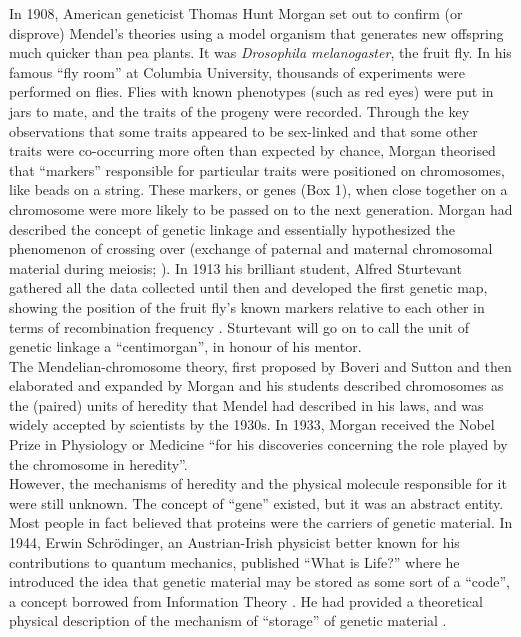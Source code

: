 In 1908, American geneticist Thomas Hunt Morgan set out to confirm (or disprove) Mendel’s theories using a model organism that generates new offspring much quicker than pea plants. 
It was \textit{Drosophila melanogaster}, the fruit fly. 
In his famous “fly room” at Columbia University, thousands of experiments were performed on flies. 
Flies with known phenotypes (such as red eyes) were put in jars to mate, and the traits of the progeny were recorded. 
Through the key observations that some traits appeared to be sex-linked and that some other traits were co-occurring more often than expected by chance, Morgan theorised that “markers” responsible for particular traits were positioned on chromosomes, like beads on a string. 
These markers, or genes (Box 1), when close together on a chromosome were more likely to be passed on to the next generation. 
Morgan had described the concept of genetic linkage and essentially hypothesized the phenomenon of crossing over (exchange of paternal and maternal chromosomal material during meiosis; \cite{morgan1911random}). 
In 1913 his brilliant student, Alfred Sturtevant gathered all the data collected until then and developed the first genetic map, showing the position of the fruit fly’s known markers relative to each other in terms of recombination frequency \cite{sturtevant1913linear}. 
Sturtevant will go on to call the unit of genetic linkage a “centimorgan”, in honour of his mentor.\\

The Mendelian-chromosome theory, first proposed by Boveri and Sutton \cite{sutton1903chromosomes} and then elaborated and expanded by Morgan and his students \cite{morgan1915mechanism} described chromosomes as the (paired) units of heredity that Mendel had described in his laws, and was widely accepted by scientists by the 1930s. 
In 1933, Morgan received the Nobel Prize in Physiology or Medicine “for his discoveries concerning the role played by the chromosome in heredity”.\\

However, the mechanisms of heredity and the physical molecule responsible for it were still unknown. 
The concept of “gene” existed, but it was an abstract entity. 
Most people in fact believed that proteins were the carriers of genetic material. 
In 1944, Erwin  Schrödinger, an Austrian-Irish physicist better known for his contributions to quantum mechanics, published “What is Life?” where he introduced the idea that genetic material may be stored as some sort of a “code”, a concept borrowed from Information Theory \cite{schrodinger1944what}. 
He had provided a theoretical physical description of the mechanism of “storage” of genetic material \cite{mukherjee2016gene}.

